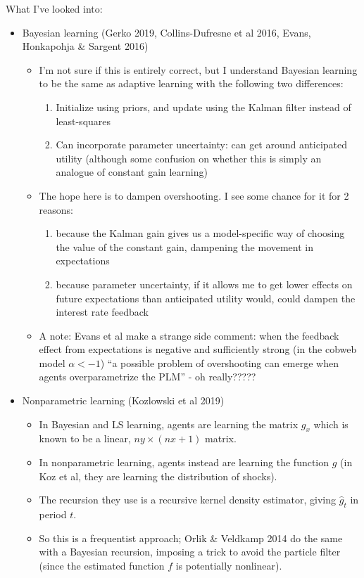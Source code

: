 \documentclass[11pt]{article}
\renewcommand{\[}{\begin{equation}}
\renewcommand{\]}{\end{equation}}
\begin{document}
What I've looked into:
\begin{itemize}
\item Bayesian learning (Gerko 2019, Collins-Dufresne et al 2016, Evans, Honkapohja \& Sargent 2016)
\begin{itemize}
\item I'm not sure if this is entirely correct, but I understand Bayesian learning to be the same as adaptive learning with the following two differences:
\begin{enumerate}
\item Initialize using priors, and update using the Kalman filter instead of least-squares
\item Can incorporate parameter uncertainty: can get around anticipated utility (although some confusion on whether this is simply an analogue of constant gain learning)
\end{enumerate}
\item The hope here is to dampen overshooting. I see some chance for it for 2 reasons:
\begin{enumerate} 
\item because the Kalman gain gives us a model-specific way of choosing the value of the constant gain, dampening the movement in expectations
\item because parameter uncertainty, if it allows me to get lower effects on future expectations than anticipated utility would, could dampen the interest rate feedback
\end{enumerate}
\item A note: Evans et al make a strange side comment: when the feedback effect from expectations is negative and sufficiently strong (in the cobweb model $\alpha < -1$) ``a possible problem of overshooting can emerge when agents overparametrize the PLM'' - oh really?????
\end{itemize}
\item Nonparametric learning (Kozlowski et al 2019)
\begin{itemize}
\item In Bayesian and LS learning, agents are learning the matrix $g_x$ which is known to be a linear, $ny \times (nx+1)$ matrix.
\item In nonparametric learning, agents instead are learning the function $g$ (in Koz et al, they are learning the distribution of shocks).
\item The recursion they use is a recursive kernel density estimator, giving $\hat{g}_t$ in period $t$.
\item So this is a frequentist approach; Orlik \& Veldkamp 2014 do the same with a Bayesian recursion, imposing a trick to avoid the particle filter (since the estimated function $f$ is potentially nonlinear).

\end{itemize}
\end{itemize}
\end{document}
